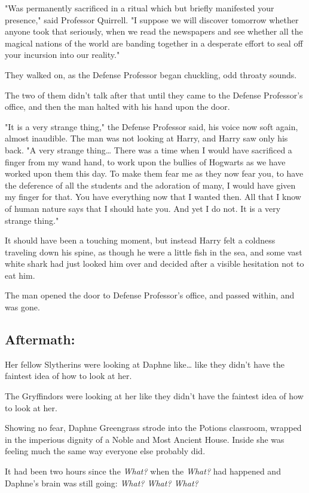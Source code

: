 "Was permanently sacrificed in a ritual which but briefly manifested your 
presence," said Professor Quirrell. "I suppose we will discover tomorrow 
whether anyone took that seriously, when we read the newspapers and see whether 
all the magical nations of the world are banding together in a desperate effort 
to seal off your incursion into our reality."

They walked on, as the Defense Professor began chuckling, odd throaty sounds.

The two of them didn't talk after that until they came to the Defense 
Professor's office, and then the man halted with his hand upon the door.

"It is a very strange thing," the Defense Professor said, his voice now soft 
again, almost inaudible. The man was not looking at Harry, and Harry saw only 
his back. "A very strange thing{\ldots} There was a time when I would have 
sacrificed a finger from my wand hand, to work upon the bullies of Hogwarts as 
we have worked upon them this day. To make them fear me as they now fear you, 
to have the deference of all the students and the adoration of many, I would 
have given my finger for that. You have everything now that I wanted then. All 
that I know of human nature says that I should hate you. And yet I do not. It 
is a very strange thing."

It should have been a touching moment, but instead Harry felt a coldness 
traveling down his spine, as though he were a little fish in the sea, and some 
vast white shark had just looked him over and decided after a visible 
hesitation not to eat him.

The man opened the door to Defense Professor's office, and passed within, and 
was gone.
\sbreak
\subsection{Aftermath:}

Her fellow Slytherins were looking at Daphne like{\ldots} like they didn't have 
the faintest idea of how to look at her.

The Gryffindors were looking at her like they didn't have the faintest idea of 
how to look at her.

Showing no fear, Daphne Greengrass strode into the Potions classroom, wrapped 
in the imperious dignity of a Noble and Most Ancient House. Inside she was 
feeling much the same way everyone else probably did.

It had been two hours since the \emph{What?} when the \emph{What?} had happened 
and Daphne's brain was still going: \emph{What? What? What?}

